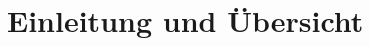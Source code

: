 \begin{comment}
Einführung in die Problem- und Aufgabenstellung. Übersicht über die übrigen
Teile der Abgabe.
Diese Einleitung soll für den Ingenieur irgendeiner Fachrichtung
verständlich sein. Sie stellt die Aufgabe in einen grösseren
Zusammenhang und liefert eine genaue Beschreibung der
Problemstellung. Allfällige Vorarbeiten oder ähnlich gelagerte Arbeiten
werden diskutiert.
\end{comment}

\chapter{Einleitung und Übersicht}
\xxx